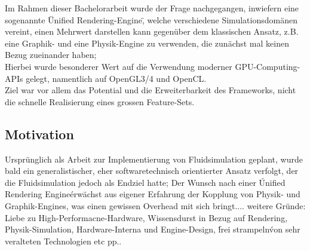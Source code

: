 Im Rahmen dieser Bachelorarbeit wurde der Frage nachgegangen, inwiefern eine sogenannte \"Unified Rendering-Engine\", welche verschiedene Simulationsdom{\"a}nen 
vereint, einen Mehrwert darstellen kann gegenüber dem klassischen Ansatz, z.B. eine Graphik- und eine Physik-Engine zu verwenden, die zun{\"a}chst mal keinen
Bezug zueinander haben; \\
Hierbei wurde besonderer Wert auf die Verwendung moderner GPU-Computing-APIs gelegt, namentlich auf OpenGL3/4 und OpenCL.\\
Ziel war vor allem das Potential und die Erweiterbarkeit des Frameworks, nicht die schnelle Realisierung eines grossen Feature-Sets.

\subsection{Motivation}

	Urspr{\"u}nglich als Arbeit zur Implementierung von Fluidsimulation geplant, wurde bald ein generalistischer, eher softwaretechnisch orientierter Ansatz verfolgt,
	der die Fluidsimulation jedoch als Endziel hatte;
	Der Wunsch nach einer \'Unified Rendering Engine\' erw{\"a}chst aus eigener Erfahrung der Kopplung von Physik- und Graphik-Engines, was einen gewissen Overhead mit sich 	bringt.... weitere Gr{\"u}nde: Liebe zu High-Performacne-Hardware, Wissensdurst in Bezug auf Rendering, Physik-Simulation, Hardware-Interna und Engine-Design,
	\'frei strampeln\' von sehr veralteten Technologien etc pp..  

\clearpage